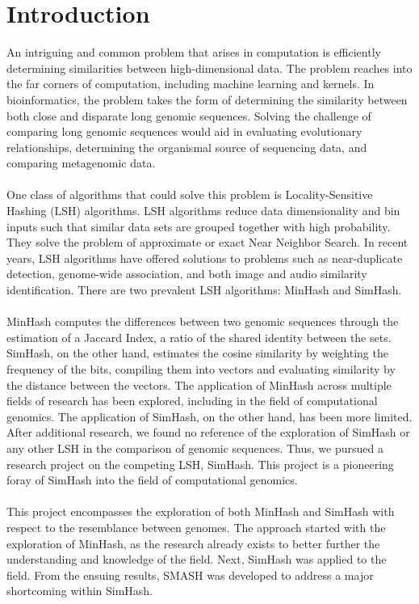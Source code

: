 \documentclass[12pt, letterpaper]{article}
\begin{document}
\section{Introduction}
An intriguing and common problem that arises in computation is efficiently determining similarities between high-dimensional data. The problem reaches into the far corners of computation, including machine learning and kernels. In bioinformatics, the problem takes the form of determining the similarity between both close and disparate long genomic sequences. Solving the challenge of comparing long genomic sequences would aid in evaluating evolutionary relationships, determining the organismal source of sequencing data, and comparing metagenomic data. \\ \\
One class of algorithms that could solve this problem is Locality-Sensitive Hashing (LSH) algorithms. LSH algorithms reduce data dimensionality and bin inputs such that similar data sets are grouped together with high probability. They solve the problem of approximate or exact Near Neighbor Search. In recent years, LSH algorithms have offered solutions to problems such as near-duplicate detection, genome-wide association, and both image and audio similarity identification. There are two prevalent LSH algorithms: MinHash and SimHash. \\ \\
MinHash computes the differences between two genomic sequences through the estimation of a Jaccard Index, a ratio of the shared identity between the sets. SimHash, on the other hand, estimates the cosine similarity by weighting the frequency of the bits, compiling them into vectors and evaluating similarity by the distance between the vectors. The application of MinHash across multiple fields of research has been explored, including in the field of computational genomics. The application of SimHash, on the other hand, has been more limited. After additional research, we found no reference of the exploration of SimHash or any other LSH in the comparison of genomic sequences. Thus, we pursued a research project on the competing LSH, SimHash. This project is a pioneering foray of SimHash into the field of computational genomics. \\ \\
This project encompasses the exploration of both MinHash and SimHash with respect to the resemblance between genomes. The approach started with the exploration of MinHash, as the research already exists to better further the understanding and knowledge of the field. Next, SimHash was applied to the field. From the ensuing results, SMASH was developed to address a major shortcoming within SimHash.
\end{document}
